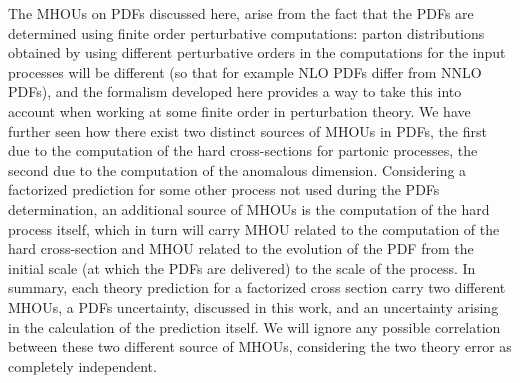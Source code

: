     The MHOUs on PDFs discussed here, arise from the fact that the PDFs are determined using finite order
    perturbative computations: parton distributions obtained by using different perturbative orders in the computations
    for the input processes will be different (so that for example NLO PDFs differ from NNLO PDFs), and the formalism
    developed here provides a way to take this into account when working at some finite order in
    perturbation theory. 
    We have further seen how there exist two distinct sources of MHOUs in PDFs, the first due to the computation
    of the hard cross-sections for partonic processes, the second due to the computation of the anomalous dimension.
    Considering a factorized prediction for some other process not used during the PDFs determination, 
    an additional source of MHOUs is the computation of the hard process itself, which in turn will 
    carry MHOU related to the computation of the hard cross-section and MHOU related to the evolution of the PDF
    from the initial scale (at which the PDFs are delivered) to the scale of the process.
    In summary, each theory prediction for a factorized cross section carry two different MHOUs,
    a PDFs uncertainty, discussed in this work, and an uncertainty arising in the calculation of the prediction itself. 
    We will ignore any possible correlation between these two different source of MHOUs, 
    considering the two theory error as completely independent.
    
